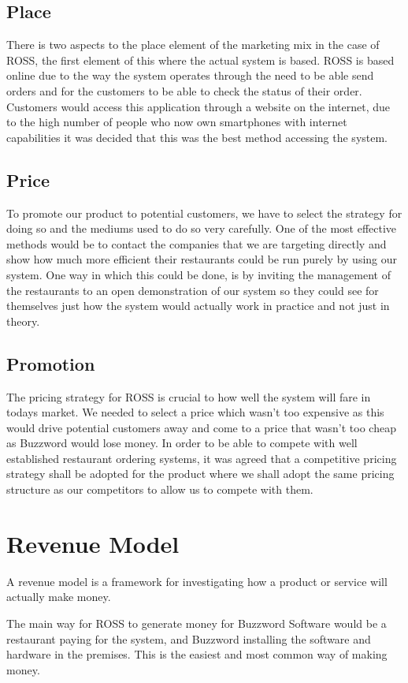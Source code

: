 \documentclass[11pt, oneside, a4paper]{report}   %
\begin{document}
\begin{flushleft}
\subsection{Place}
There is two aspects to the place element of the marketing mix in the case of ROSS, the first element of this where the actual system is based. ROSS is based online due to the way the system operates through the need to be able send orders and for the customers to be able to check the status of their order. Customers would access this application through a website on the internet, due to the high number of people who now own smartphones with internet capabilities it was decided that this was the best method accessing the system. 
\subsection{Price}
To promote our product to potential customers, we have to select the strategy for doing so and the mediums used to do so very carefully. One of the most effective methods would be to contact the companies that we are targeting directly and show how much more efficient their restaurants could be run purely by using our system. One way in which this could be done, is by inviting the management of the restaurants to an open demonstration of our system so they could see for themselves just how the system would actually work in practice and not just in theory. 
\subsection{Promotion}
The pricing strategy for ROSS is crucial to how well the system will fare in todays market. We needed to select a price which wasn’t too expensive as this would drive potential customers away and come to a price that wasn’t too cheap as Buzzword would lose money. In order to be able to compete with well established restaurant ordering systems, it was agreed that a competitive pricing strategy shall be adopted for the product where we shall adopt the same pricing structure as our competitors to allow us to compete with them. 


\newpage
\section{Revenue Model}
A revenue model is a framework for investigating how a product or service will actually make money. 

The main way for ROSS to generate money for Buzzword Software would be a restaurant paying for the system, and Buzzword installing the software and hardware in the premises. This is the easiest and most common way of making money.


\end{flushleft}
\end{document}

